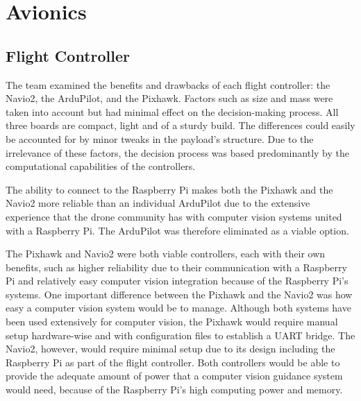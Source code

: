 	\section{Avionics}\label{PL:Design:Avionics}
		\subsection{Flight Controller}
		The team examined the benefits and drawbacks of each flight controller: the Navio2, the ArduPilot, and the Pixhawk. Factors such as size and mass were taken into account but had minimal effect on the decision-making process. All three boards are compact, light and of a sturdy build. The differences could easily be accounted for by minor tweaks in the payload’s structure. Due to the irrelevance of these factors, the decision process was based predominantly by the computational capabilities of the controllers. 

		The ability to connect to the Raspberry Pi makes both the Pixhawk and the Navio2 more reliable than an individual ArduPilot due to the extensive experience that the drone community has with computer vision systems united with a Raspberry Pi. The ArduPilot was therefore eliminated as a viable option. 
		
		The Pixhawk and Navio2 were both viable controllers, each with their own benefits, such as higher reliability due to their communication with a Raspberry Pi and relatively easy computer vision integration because of the Raspberry Pi’s systems. One important difference between the Pixhawk and the Navio2 was how easy a computer vision system would be to manage. Although both systems have been used extensively for computer vision, the Pixhawk would require manual setup hardware-wise and with configuration files to establish a UART bridge. The Navio2, however, would require minimal setup due to its design including the Raspberry Pi as part of the flight controller. Both controllers would be able to provide the adequate amount of power that a computer vision guidance system would need, because of the Raspberry Pi’s high computing power and memory. 
		
